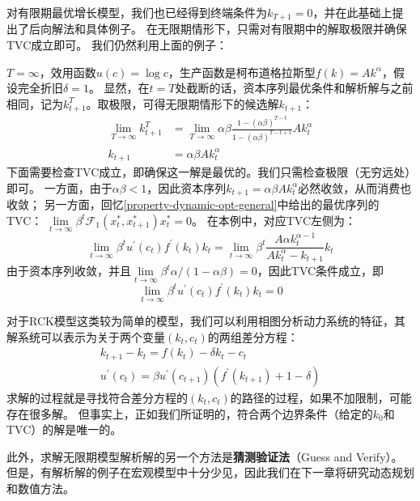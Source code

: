 对有限期最优增长模型，我们也已经得到终端条件为$k_{T+1}=0$，并在此基础上提出了后向解法和具体例子。
在无限期情形下，只需对有限期中的解取极限并确保TVC成立即可。
我们仍然利用上面的例子：
\begin{example}
    $T=\infty$，效用函数$u(c) = \log c$，生产函数是柯布道格拉斯型$f(k) = Ak^{\alpha}$，假设完全折旧$\delta = 1$。
    显然，在$t=T$处截断的话，资本序列最优条件和解析解与之前相同，记为$k_{t+1}^T$。取极限，可得无限期情形下的候选解$k_{t+1}$：
    \begin{equation*}
        \begin{aligned}
            \lim _{T \rightarrow \infty} k_{t+1}^T & =\lim _{T \rightarrow \infty} \alpha \beta 
                \frac{1-(\alpha \beta)^{T-t}}{1-(\alpha \beta)^{T-t+1}} A k_t^\alpha \\
            k_{t+1} & =\alpha \beta A k_t^\alpha
        \end{aligned}
    \end{equation*}
    下面需要检查TVC成立，即确保这一解是最优的。我们只需检查极限（无穷远处）即可。
    一方面，由于$\alpha\beta<1$，因此资本序列$k_{t+1}  =\alpha \beta A k_t^\alpha$必然收敛，从而消费也收敛；
    另一方面，回忆\cref{property-dynamic-opt-general}中给出的最优序列的TVC：
    $\lim\limits_{t\rightarrow\infty}\beta^t \mathcal{F}_1\left(x_t^*,x_{t+1}^*\right) x_t^*=0$。
    在本例中，对应TVC左侧为：
    \begin{equation*}
        \lim _{t \rightarrow \infty} \beta^t u^{\prime}\left(c_t\right) f^{\prime}\left(k_t\right) k_t
            =\lim _{t \rightarrow \infty} \beta^t \frac{A \alpha k_t^{\alpha-1}}{A k_t^\alpha-k_{t+1}} k_t
    \end{equation*}
    由于资本序列收敛，并且$\lim\limits_{t\rightarrow \infty}\beta^t \alpha / (1-\alpha\beta)=0$，因此TVC条件成立，即
    \begin{equation*}
        \lim _{t \rightarrow \infty} \beta^t u^{\prime}\left(c_t\right) f^{\prime}\left(k_t\right) k_t = 0
    \end{equation*}
\end{example}

对于RCK模型这类较为简单的模型，我们可以利用相图分析动力系统的特征，其解系统可以表示为关于两个变量$(k_t,c_t)$的两组差分方程：
\begin{equation*}
    \begin{aligned}
        k_{t+1} - k_t = f(k_t) - \delta k_t - c_t \\
        u^{\prime}(c_t) = \beta u^{\prime}(c_{t+1})\left(f^{\prime}\left(k_{t+1}\right)+1-\delta\right)
    \end{aligned}
\end{equation*}
求解的过程就是寻找符合差分方程的$(k_t,c_t)$的路径的过程，如果不加限制，可能存在很多解。
但事实上，正如我们所证明的，符合两个边界条件（给定的$k_0$和TVC）的解是唯一的。

此外，求解无限期模型解析解的另一个方法是\textbf{猜测验证法}（Guess and Verify）。
但是，有解析解的例子在宏观模型中十分少见，因此我们在下一章将研究动态规划和数值方法。
